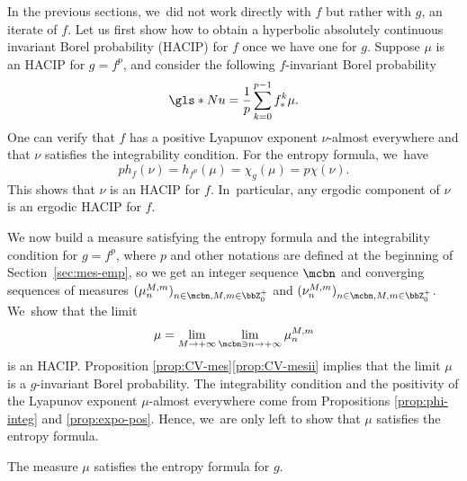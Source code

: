 In the previous sections, we~did not work directly with $f$ but rather with $g$, an iterate of $f$. Let us first show how to obtain a hyperbolic absolutely continuous invariant Borel probability (\gls*{HACIP}) for $f$ once we have one for $g$.
Suppose $\mu$ is an HACIP for $g = f^p$, and consider the following $f$\nobreakdash-invariant Borel probability
\[
\gls*{Nu} = \frac{1}{p}\sum_{k=0}^{p-1} f^k_* \mu.
\]
One can verify that $f$ has a positive Lyapunov exponent $\nu$-almost everywhere and that $\nu$ satisfies the integrability condition.
For the entropy formula, we~have
\[
p h_f(\nu) = h_{f^p}(\mu) = \chi_g(\mu) = p \chi(\nu).
\]
This shows that $\nu$ is an HACIP for $f$. In~particular, any ergodic component of $\nu$ is an ergodic HACIP for $f$.

We now build a measure satisfying the entropy formula and the integrability condition for $g = f^p$, where $p$ and other notations are defined at the beginning of Section~\ref{sec:mes-emp}, so we get an integer sequence $\mcbn$ and converging sequences of measures $(\mu_n^{M,m})_{n \in \mcbn, M,m \in \bbZ_0^+}$ and $(\nu_n^{M,m})_{n \in \mcbn, M,m \in \bbZ_0^+}$. We~show that the limit
\[
\mu = \lim_{M \to +\infty} \lim_{\mcbn \ni n \to +\infty} \mu_n^{M,m}
\]
is an HACIP.
Proposition \ref{prop:CV-mes}\eqref{prop:CV-mesii} implies that the limit $\mu$ is a $g$-invariant Borel probability.
The integrability condition and the positivity of the Lyapunov exponent $\mu$\nobreakdash-almost everywhere come from Propositions \ref{prop:phi-integ} and \ref{prop:expo-pos}.
Hence, we~are only left to show that $\mu$ satisfies the entropy formula.

\begin{prop}
\label{prop:formule-entropie}
The measure $\mu$ satisfies the entropy formula for $g$.
\end{prop}

